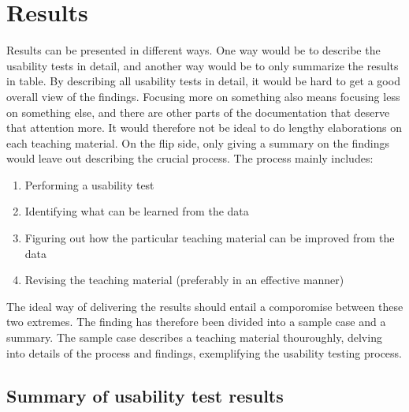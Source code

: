 \chapter{Results}
Results can be presented in different ways. One way would be to describe the usability tests in detail, and another way would be to only summarize the results in table. 
By describing all usability tests in detail, it would be hard to get a good overall view of the findings. Focusing more on something also means focusing less on something 
else, and there are other parts of the documentation that deserve that attention more. It would therefore not be ideal to do lengthy elaborations on each teaching material.
On the flip side, only giving a summary on the findings would leave out describing the crucial process. The process mainly includes:
\begin{enumerate}
	\item Performing a usability test
	\item Identifying what can be learned from the data
	\item Figuring out how the particular teaching material can be improved from the data
	\item Revising the teaching material (preferably in an effective manner)
\end{enumerate}
The ideal way of delivering the results should entail a comporomise between these two extremes. The finding has therefore been divided into a sample case and a summary.
The sample case describes a teaching material thouroughly, delving into details of the process and findings, exemplifying the usability testing process. 


%

\section{Summary of usability test results}

